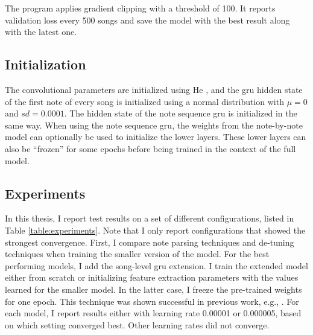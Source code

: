 The program applies gradient clipping \cite{pascanu2013difficulty} with a threshold of 100. It reports validation loss every 500 songs and save the model with the best result along with the latest one. 
\subsection{Initialization}
The convolutional parameters are initialized using He \cite{he2015delving}, and the \gls{gru} hidden state of the first note of every song is initialized using a normal distribution with $\mu=0$ and $sd=0.0001$. The hidden state of the note sequence \gls{gru} is initialized in the same way. When using the note sequence \gls{gru}, the weights from the note-by-note model can optionally be used to initialize the lower layers. These lower layers can also be ``frozen'' for some epochs before being trained in the context of the full model. 

\subsection{Experiments}
\label{sec:experiment-list}
In this thesis, I report test results on a set of different configurations, listed in Table \ref{table:experiments}. Note that I only report configurations that showed the strongest convergence. First, I compare note parsing techniques and de-tuning techniques when training the smaller version of the model. For the best performing models, I add the song-level \gls{gru} extension. I train the extended model either from scratch or initializing feature extraction parameters with the values learned for the smaller model. In the latter case, I freeze the pre-trained weights for one epoch. This technique was shown successful in previous work, e.g., \cite{wager2020fully}. For each model, I report results either with learning rate 0.00001 or 0.000005, based on which setting converged best. Other learning rates did not converge.

